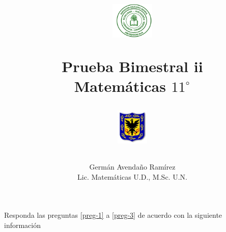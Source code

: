 \documentclass[10pt,letterpaper,addpoints]{exam}
\begin{document}
\title{\begin{minipage}{.2\textwidth}
        \includegraphics[height=1.75cm]{Images/logo-colegio.png}
       \end{minipage}
\begin{minipage}{.55\textwidth}
 \begin{center}
Prueba Bimestral ii\\Matem\'{a}ticas $11^{\circ}$
\end{center}
\end{minipage}
\begin{minipage}{.2\textwidth}
\includegraphics[height=1.75cm]{Images/logo-sed.png} 
\end{minipage}
}
\author{Germ\'{a}n Avendaño Ram\'{i}rez\\Lic. Matemáticas U.D., M.Sc. U.N.}
\date{}
\maketitle
\begin{center}
\end{center}
\vspace{0.1in}
Responda las preguntas \ref{preg-1} a \ref{preg-3} de acuerdo con la siguiente información
\end{document}
